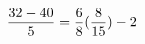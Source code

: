 \documentclass[preview]{standalone}
\begin{document}
\begin{align*}
\special{dvisvgm:raw <g id='unique000'>}\frac{32 - 40}{5} = \frac{6}{8} (\frac{8}{15}) - 2\special{dvisvgm:raw </g>}
\end{align*}
\end{document}
